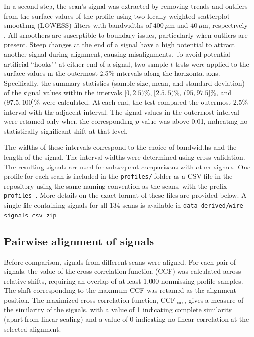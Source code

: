\documentclass[11pt,a4paper]{article}
\begin{document}
In a second step, the scan's signal was extracted by removing trends and
outliers from the surface values of the profile using two locally
weighted scatterplot smoothing (LOWESS) filters with bandwidths of
\(400\,\mu\mathrm{m}\) and \(40\,\mu\mathrm{m}\), respectively
\citep{clevelandLocalRegressionModels1992}. All smoothers are
susceptible to boundary issues, particularly when outliers are present.
Steep changes at the end of a signal have a high potential to attract
another signal during alignment, causing misalignments. To avoid
potential artificial ``hooks'\,' at either end of a signal, two-sample
\(t\)-tests were applied to the surface values in the outermost 2.5\%
intervals along the horizontal axis. Specifically, the summary
statistics (sample size, mean, and standard deviation) of the signal
values within the intervals \([0, 2.5)\%\), \([2.5, 5)\%\),
\((95, 97.5]\%\), and \((97.5, 100]\%\) were calculated. At each end,
the test compared the outermost 2.5\% interval with the adjacent
interval. The signal values in the outermost interval were retained only
when the corresponding \(p\)-value was above 0.01, indicating no
statistically significant shift at that level.

The widths of these intervals correspond to the choice of bandwidths and
the length of the signal. The interval widths were determined using
cross-validation. The resulting signals are used for subsequent
comparisons with other signals. One profile for each scan is included in
the \texttt{profiles/} folder as a CSV file in the repository using the
same naming convention as the scans, with the prefix \texttt{profiles-}.
More details on the exact format of these files are provided below. A
single file containing signals for all 134 scans is available in
\texttt{data-derived/wire-signals.csv.zip}.

\subsection*{Pairwise alignment of signals}\label{sec-align-signals}

Before comparison, signals from different scans were aligned. For each
pair of signals, the value of the cross-correlation function (CCF) was
calculated across relative shifts, requiring an overlap of at least
1,000 nonmissing profile samples. The shift corresponding to the maximum
CCF was retained as the alignment position. The maximized
cross-correlation function, \(\mathrm{CCF}_{\max}\), gives a measure of
the similarity of the signals, with a value of 1 indicating complete
similarity (apart from linear scaling) and a value of 0 indicating no
linear correlation at the selected alignment.
\end{document}
